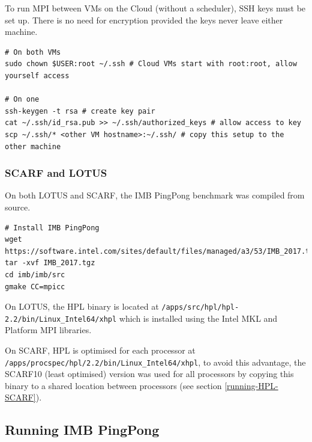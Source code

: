 \documentclass{article}
\newenvironment{code}{\captionsetup{type=listing}}{}
\begin{document}
        To run MPI between VMs on the Cloud (without a scheduler), SSH keys must be set up. There is no need for encryption provided the keys never leave either machine.
            \begin{code}
            \label{code:builds-cloud-setupssh-sh}
            \begin{verbatim}
# On both VMs
sudo chown $USER:root ~/.ssh # Cloud VMs start with root:root, allow yourself access

# On one
ssh-keygen -t rsa # create key pair
cat ~/.ssh/id_rsa.pub >> ~/.ssh/authorized_keys # allow access to key
scp ~/.ssh/* <other VM hostname>:~/.ssh/ # copy this setup to the other machine
            \end{verbatim}
            \end{code}

        \subsubsection{SCARF and LOTUS}
        On both LOTUS and SCARF, the IMB PingPong benchmark was compiled from source.

            \begin{code}
            \label{code:builds-jasmin_scarf-buildimb-sh}
            \begin{verbatim}
# Install IMB PingPong
wget https://software.intel.com/sites/default/files/managed/a3/53/IMB_2017.tgz
tar -xvf IMB_2017.tgz
cd imb/imb/src
gmake CC=mpicc
            \end{verbatim}
            \end{code}


        On LOTUS, the HPL binary is located at \verb|/apps/src/hpl/hpl-2.2/bin/Linux_Intel64/xhpl| which is installed using the Intel MKL and Platform MPI libraries.

        On SCARF, HPL is optimised for each processor at \verb|/apps/procspec/hpl/2.2/bin/Linux_Intel64/xhpl|, to avoid this advantage, the SCARF10 (least optimised) version was used for all processors by copying this binary to a shared location between processors (see section \ref{running-HPL-SCARF}).




    \subsection{Running IMB PingPong}
\end{document}
